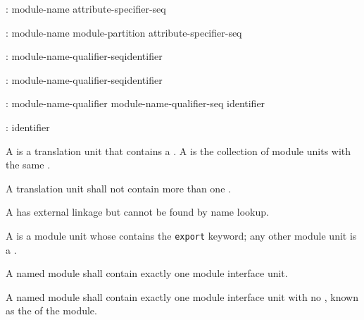 \begin{std.txt}\color{addclr}
\begin{before}\color{addclr}
\begin{bnf}
:\br
   \opt{}  module-name attribute-specifier-seq\opt{} \terminal{;}
\end{bnf}
\end{before}\begin{after}\color{addclr}
\begin{bnf}
:\br
   \opt{}  module-name module-partition\opt{} attribute-specifier-seq\opt{} \terminal{;}
\end{bnf}
\end{after}
  
  \begin{bnf}\color{addclr}
    :\br
      module-name-qualifier-seq\opt identifier
  \end{bnf}
  
  \begin{after}
  \begin{bnf}\color{addclr}
    :\br
      \terminal{:} module-name-qualifier-seq\opt identifier
  \end{bnf}
  \end{after}
  
  \begin{bnf}\color{addclr}
    :\br
      module-name-qualifier  \br
      module-name-qualifier-seq identifier 
  \end{bnf}
  
  \begin{bnf}\color{addclr}
    :\br
      identifier
  \end{bnf}
  
  \resetalinea[0]
\alinea A  is a translation unit that contains
a . A  is the
collection of module units with the same .
\begin{before}\color{addclr}
A translation unit shall not contain more than
one .
\end{before}
A 
has external linkage but cannot be found by name lookup.

\alinea
A  is a module unit whose
 contains the \texttt{export} keyword;
any other module unit is a .
\begin{before}\color{addclr}
A named module shall contain exactly one module interface unit.
\end{before}
\begin{after}\color{addclr}
A named module shall contain exactly one module interface unit
with no , known as the
 of the module.
\end{after}


\end{std.txt}
